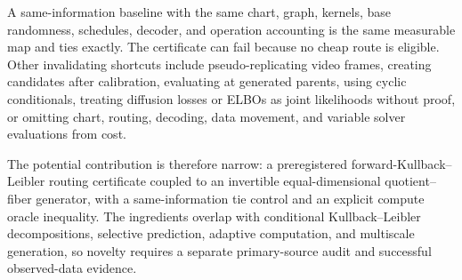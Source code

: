 \documentclass[11pt]{article}
\begin{document}
A same-information baseline with the same chart, graph, kernels, base randomness, schedules, decoder, and operation accounting is the same measurable map and ties exactly.  The certificate can fail because no cheap route is eligible.  Other invalidating shortcuts include pseudo-replicating video frames, creating candidates after calibration, evaluating at generated parents, using cyclic conditionals, treating diffusion losses or ELBOs as joint likelihoods without proof, or omitting chart, routing, decoding, data movement, and variable solver evaluations from cost.

The potential contribution is therefore narrow: a preregistered forward-Kullback--Leibler routing certificate coupled to an invertible equal-dimensional quotient--fiber generator, with a same-information tie control and an explicit compute oracle inequality.  The ingredients overlap with conditional Kullback--Leibler decompositions, selective prediction, adaptive computation, and multiscale generation, so novelty requires a separate primary-source audit and successful observed-data evidence.
\end{document}
